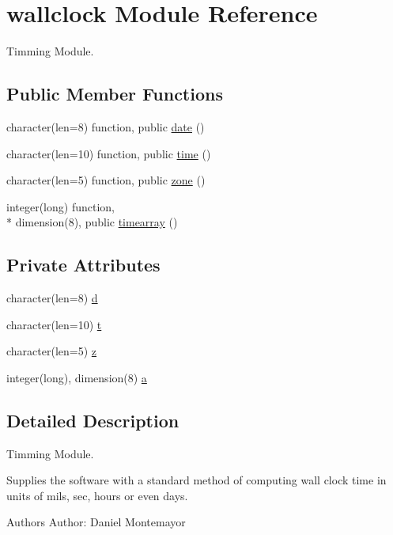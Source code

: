 \hypertarget{classwallclock}{\section{wallclock Module Reference}
\label{classwallclock}
}


Timming Module.  


\subsection*{Public Member Functions}
\begin{DoxyCompactItemize}
\item 
character(len=8) function, public \hyperlink{classwallclock_aac2bc47e557d4981f481295bd687dd50}{date} ()
\item 
character(len=10) function, public \hyperlink{classwallclock_a3efb3d12447df7568e0b22b3cd4ed60d}{time} ()
\item 
character(len=5) function, public \hyperlink{classwallclock_ac6bdcdd3cf7fc38f4c738862e2a82dac}{zone} ()
\item 
integer(long) function, \\*
dimension(8), public \hyperlink{classwallclock_ac691a026a7b92c6cd971e86d0449d42b}{timearray} ()
\end{DoxyCompactItemize}
\subsection*{Private Attributes}
\begin{DoxyCompactItemize}
\item 
character(len=8) \hyperlink{classwallclock_a0922e57a4f1a99af864f31246c132d4c}{d}
\item 
character(len=10) \hyperlink{classwallclock_a8a94eeecb39db73f1c36c9b00a95c9f7}{t}
\item 
character(len=5) \hyperlink{classwallclock_a47a8e5d4efccd0142b0587c873dad88b}{z}
\item 
integer(long), dimension(8) \hyperlink{classwallclock_a634d56ca30b98ea804c6d33a0a635ec0}{a}
\end{DoxyCompactItemize}


\subsection{Detailed Description}
Timming Module. 

Supplies the software with a standard method of computing wall clock time in units of mils, sec, hours or even days. \begin{DoxyAuthor}{Authors}
Author\+: Daniel Montemayor 
\end{DoxyAuthor}



